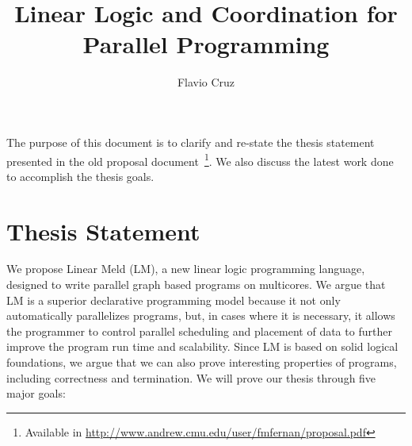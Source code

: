 \documentclass[10pt]{article}
\title{Linear Logic and Coordination for Parallel Programming}
\author{Flavio Cruz}
\begin{document}
\maketitle

The purpose of this document is to clarify and re-state the thesis statement
presented in the old proposal document~\footnote{Available in
   \url{http://www.andrew.cmu.edu/user/fmfernan/proposal.pdf}}. We also discuss
   the latest work done to accomplish the thesis goals.

\section{Thesis Statement}

We propose Linear Meld (LM), a new linear logic programming language, designed
to write parallel graph based programs on multicores.  We argue that LM is a
superior declarative programming model because it not only automatically
parallelizes programs, but, in cases where it is necessary, it allows the
programmer to control parallel scheduling and placement of data to further
improve the program run time and scalability.  Since LM is based on solid
logical foundations, we argue that we can also prove interesting properties of
programs, including correctness and termination. We will prove our thesis
through five major goals:
\end{document}
